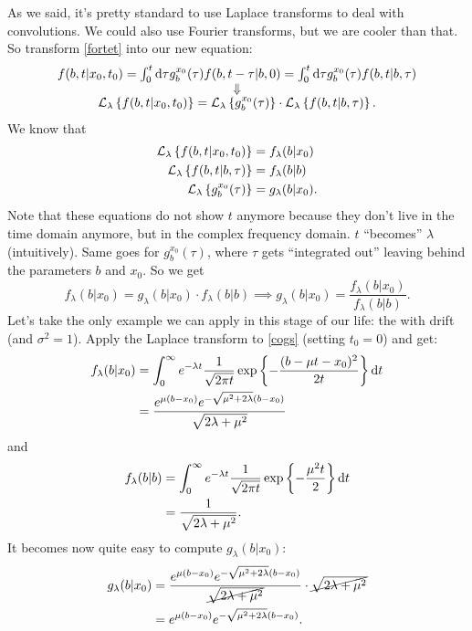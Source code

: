 \documentclass[12pt]{report}
\begin{document}
As we said, it's pretty standard to use Laplace transforms to deal with convolutions. We could also use Fourier transforms, but we are cooler than that. So transform \ref{fortet} into our new equation:
\begin{equation*}
	\begin{array}{c}
			f(b,t|x_{0},t_{0})=\int_{0}^{t}\mathop{}\!\mathrm{d}\tau g_{b}^{x_{0}}(\tau)f(b,t-\tau|b,0)=\int_{0}^{t}\mathop{}\!\mathrm{d}\tau g_{b}^{x_{0}}(\tau)f(b,t|b,\tau)\\[-0.4pt]
			\Downarrow\\[-1pt]
			\mathcal{L}_{\lambda}\left\{f(b,t|x_{0},t_{0})\right\}=\mathcal{L}_{\lambda}\left\{g_{b}^{x_{0}}(\tau)\right\}\cdot\mathcal{L}_{\lambda}\left\{f(b,t|b,\tau)\right\}.
	\end{array}
\end{equation*}
We know that 
\begin{align*}
	\mathcal{L}_{\lambda}\left\{f(b,t|x_{0},t_{0})\right\}&=f_{\lambda}(b|x_{0})\\
	\mathcal{L}_{\lambda}\left\{f(b,t|b,\tau)\right\}&=f_{\lambda}(b|b)\\
	\mathcal{L}_{\lambda}\left\{g_{b}^{x_{0}}(\tau)\right\}&=g_{\lambda}(b|x_{0}).
\end{align*}
Note that these equations do not show $t$ anymore because they don't live in the time domain anymore, but in the complex frequency domain. $t$ ``becomes'' $\lambda$ (intuitively). Same goes for $g_{b}^{x_{0}}(\tau)$, where $\tau$ gets ``integrated out'' leaving behind the parameters $b$ and $x_{0}$. So we get
\begin{equation*}
	f_{\lambda}(b|x_{0})=g_{\lambda}(b|x_{0})\cdot f_{\lambda}(b|b)\implies g_{\lambda}(b|x_{0})=\frac{f_{\lambda}(b|x_{0})}{f_{\lambda}(b|b)}.
\end{equation*}
Let's take the only example we can apply in this stage of our life: the \bwm{} with drift (and $\sigma^{2}=1$). Apply the Laplace transform to \ref{cogs} (setting $t_0=0$) and get: 
\begin{align*}
	f_{\lambda}(b|x_{0})&=\int_{0}^{\infty}e^{-\lambda t}\frac{1}{\sqrt{2\pi t}}\exp\left\{-\frac{(b-\mu t-x_{0})^{2}}{2t}\right\}\mathop{}\!\mathrm{d} t\\
	&=\frac{e^{\mu(b-x_{0})}e^{-\sqrt{\mu^{2}+2\lambda}(b-x_{0})}}{\sqrt{2\lambda+\mu^{2}}}
\end{align*}
and
\begin{align*}
	f_{\lambda}(b|b)&=\int_{0}^{\infty}e^{-\lambda t}\frac{1}{\sqrt{2\pi t}}\exp\left\{-\frac{\mu^{2}t}{2}\right\}\mathop{}\!\mathrm{d} t\\
	&=\frac{1}{\sqrt{2\lambda+\mu^{2}}}.
\end{align*}
It becomes now quite easy to compute $g_{\lambda}(b|x_{0})$:
\begin{align*}
	g_{\lambda}(b|x_{0})&=\frac{e^{\mu(b-x_{0})}e^{-\sqrt{\mu^{2}+2\lambda}(b-x_{0})}}{\cancel{\sqrt{2\lambda+\mu^{2}}}}\cdot\cancel{\sqrt{2\lambda+\mu^{2}}}\\
	&=e^{\mu(b-x_{0})}e^{-\sqrt{\mu^{2}+2\lambda}(b-x_{0})}.
\end{align*}
\end{document}
